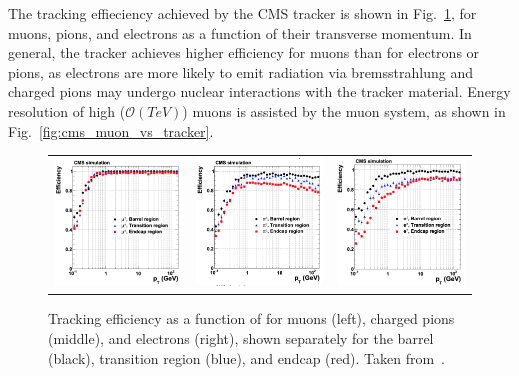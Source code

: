 The tracking effieciency achieved by the CMS tracker is shown in Fig.~\ref{fig:cms_tracker_eff}, for muons, pions, and electrons as a function of their transverse momentum.
In general, the tracker achieves higher efficiency for muons than for electrons or pions, as electrons are more likely to emit radiation via bremsstrahlung and charged pions may undergo nuclear interactions with the tracker material.
Energy resolution of high \pT ($\mathcal O(TeV)$) muons is assisted by the muon system, as shown in Fig.~\ref{fig:cms_muon_vs_tracker}.

\begin{figure} [htbp!]
    \centering
    \begin{tabular}{c c c}
        \includegraphics[width=0.33\linewidth]{figures/cms/cms_tracker_muon.png} &
        \includegraphics[width=0.33\linewidth]{figures/cms/cms_tracker_pion.png} &
        \includegraphics[width=0.33\linewidth]{figures/cms/cms_tracker_electron.png}
    \end{tabular}
    \caption{Tracking efficiency as a function of \pT for muons (left), charged pions (middle), and electrons (right), shown separately for the barrel (black), transition region (blue), and endcap (red). Taken from~\cite{Chatrchyan:1704291}.}
    \label{fig:cms_tracker_eff}
\end{figure}


